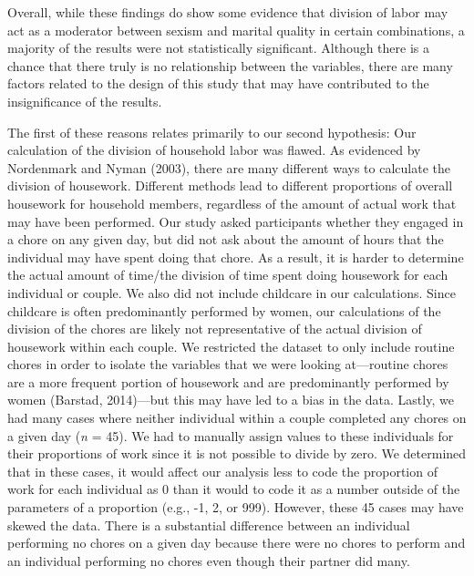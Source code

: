 \documentclass[
  english,
  man]{apa6}
\begin{document}
Overall, while these findings do show some evidence that division of labor may act as a moderator between sexism and marital quality in certain combinations, a majority of the results were not statistically significant. Although there is a chance that there truly is no relationship between the variables, there are many factors related to the design of this study that may have contributed to the insignificance of the results.

The first of these reasons relates primarily to our second hypothesis: Our calculation of the division of household labor was flawed. As evidenced by Nordenmark and Nyman (2003), there are many different ways to calculate the division of housework. Different methods lead to different proportions of overall housework for household members, regardless of the amount of actual work that may have been performed. Our study asked participants whether they engaged in a chore on any given day, but did not ask about the amount of hours that the individual may have spent doing that chore. As a result, it is harder to determine the actual amount of time/the division of time spent doing housework for each individual or couple. We also did not include childcare in our calculations. Since childcare is often predominantly performed by women, our calculations of the division of the chores are likely not representative of the actual division of housework within each couple. We restricted the dataset to only include routine chores in order to isolate the variables that we were looking at---routine chores are a more frequent portion of housework and are predominantly performed by women (Barstad, 2014)---but this may have led to a bias in the data. Lastly, we had many cases where neither individual within a couple completed any chores on a given day (\emph{n} = 45). We had to manually assign values to these individuals for their proportions of work since it is not possible to divide by zero. We determined that in these cases, it would affect our analysis less to code the proportion of work for each individual as 0 than it would to code it as a number outside of the parameters of a proportion (e.g., -1, 2, or 999). However, these 45 cases may have skewed the data. There is a substantial difference between an individual performing no chores on a given day because there were no chores to perform and an individual performing no chores even though their partner did many.
\end{document}
